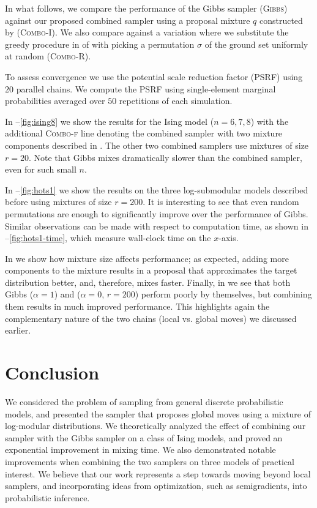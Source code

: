 In what follows, we compare the performance of the Gibbs sampler (\textsc{Gibbs}) against our proposed combined sampler using a proposal mixture $q$ constructed by  (\textsc{Combo-I}).
We also compare against a variation where we substitute the greedy procedure in  of  with picking a permutation $\sigma$ of the ground set uniformly at random (\textsc{Combo-R}).

To assess convergence we use the potential scale reduction factor (PSRF) \citep{brooks11} using $20$ parallel chains.
We compute the PSRF using single-element marginal probabilities averaged over $50$ repetitions of each simulation.

In --\ref{fig:ising8} we show the results for the Ising model ($n = 6, 7, 8$) with the additional \textsc{Combo-f} line denoting the combined sampler with two mixture components described in .
The other two combined samplers use mixtures of size $r = 20$.
Note that Gibbs mixes dramatically slower than the combined sampler, even for such small $n$.

In --\ref{fig:hots1} we show the results on the three log-submodular models described before using mixtures of size $r = 200$.
It is interesting to see that even random permutations are enough to significantly improve over the performance of Gibbs.
Similar observations can be made with respect to computation time, as shown in --\ref{fig:hots1-time}, which measure wall-clock time on the $x$-axis.

In  we show how mixture size affects performance; as expected, adding more components to the mixture results in a proposal that approximates the target distribution better, and, therefore, mixes faster.
Finally, in  we see that both Gibbs ($\alpha = 1$) and \Ms{} ($\alpha = 0$, $r = 200$) perform poorly by themselves, but combining them results in much improved performance.
This highlights again the complementary nature of the two chains (local vs. global moves) we discussed earlier.

\section{Conclusion}
We considered the problem of sampling from general discrete probabilistic models, and presented the \Ms{} sampler that proposes global moves using a mixture of log-modular distributions.
We theoretically analyzed the effect of combining our sampler with the Gibbs sampler on a class of Ising models, and proved an exponential improvement in mixing time.
We also demonstrated notable improvements when combining the two samplers on three models of practical interest.
We believe that our work represents a step towards moving beyond local samplers, and incorporating ideas from optimization, such as semigradients, into probabilistic inference.